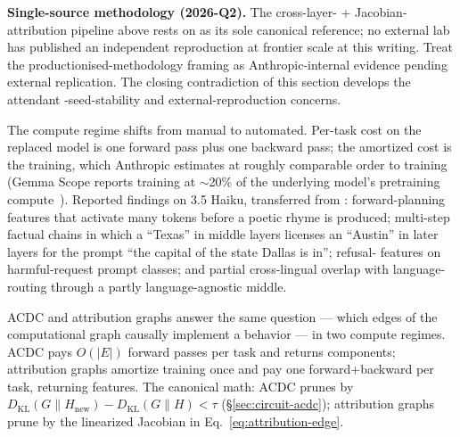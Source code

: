 \begin{forumsignal}
\textbf{Single-source methodology (2026-Q2).} The cross-layer-
+ Jacobian-attribution pipeline above rests on
\citet{lindsey2025-circuit-tracing} as its sole canonical reference; no
external lab has published an independent reproduction at frontier
scale at this writing. Treat the productionised-methodology framing as
Anthropic-internal evidence pending external replication. The closing
contradiction of this section develops the attendant
-seed-stability and external-reproduction concerns.
\end{forumsignal}

The compute regime shifts from manual to automated. Per-task cost on
the replaced model is one forward pass plus one backward pass; the
amortized cost is the  training, which Anthropic
estimates at roughly comparable order to  training (Gemma Scope
reports  training at $\sim$20\% of the underlying model's
pretraining compute~\citep{gemma-scope-2024}). Reported findings on
 3.5 Haiku, transferred from
\citet{lindsey2025-biology}: forward-planning
features that activate many tokens before a poetic rhyme is produced;
multi-step factual chains in which a ``Texas''  in middle layers
licenses an ``Austin''  in later layers for the prompt ``the
capital of the state Dallas is in''; refusal- features on
harmful-request prompt classes; and partial cross-lingual 
overlap with language-routing through a partly language-agnostic middle.

\begin{intuition}
ACDC and attribution graphs answer the same question --- which edges of
the computational graph causally implement a behavior --- in two
compute regimes. ACDC pays $O(|E|)$ forward passes per task and
returns components; attribution graphs amortize  training
once and pay one forward+backward per task, returning features. The
canonical math: ACDC prunes by
$D_{\mathrm{KL}}(G \| H_{\text{new}}) - D_{\mathrm{KL}}(G \| H) < \tau$
(\S\ref{sec:circuit-acdc}); attribution graphs prune by the linearized
Jacobian in Eq.~\eqref{eq:attribution-edge}.
\end{intuition}


